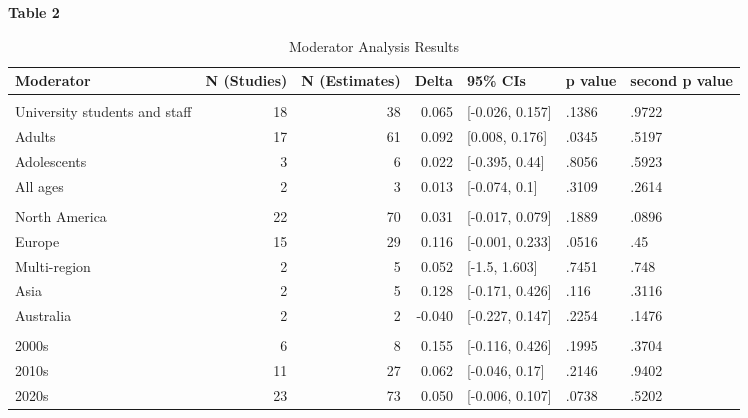 \documentclass[sn-nature,referee,pdflatex]{sn-jnl}
\begin{document}
\textbf{Table 2}

\begin{table}

\caption{\label{tab:table_two}Moderator Analysis Results}
\centering
\begin{tabular}[t]{lrrrlll}
\toprule
Moderator & N (Studies) & N (Estimates) & Delta & 95\% CIs & p value & second p value\\
\midrule
\addlinespace[0.5em]
\multicolumn{7}{l}{\textbf{Population}}\\
\hspace{1em}University students and staff & 18 & 38 & 0.065 & {}[-0.026, 0.157] & .1386 & .9722\\
\hspace{1em}Adults & 17 & 61 & 0.092 & {}[0.008, 0.176] & .0345 & .5197\\
\hspace{1em}Adolescents & 3 & 6 & 0.022 & {}[-0.395, 0.44] & .8056 & .5923\\
\hspace{1em}All ages & 2 & 3 & 0.013 & {}[-0.074, 0.1] & .3109 & .2614\\
\addlinespace[0.5em]
\multicolumn{7}{l}{\textbf{Region}}\\
\hspace{1em}North America & 22 & 70 & 0.031 & {}[-0.017, 0.079] & .1889 & .0896\\
\hspace{1em}Europe & 15 & 29 & 0.116 & {}[-0.001, 0.233] & .0516 & .45\\
\hspace{1em}Multi-region & 2 & 5 & 0.052 & {}[-1.5, 1.603] & .7451 & .748\\
\hspace{1em}Asia & 2 & 5 & 0.128 & {}[-0.171, 0.426] & .116 & .3116\\
\hspace{1em}Australia & 2 & 2 & -0.040 & {}[-0.227, 0.147] & .2254 & .1476\\
\addlinespace[0.5em]
\multicolumn{7}{l}{\textbf{Publication Decade}}\\
\hspace{1em}2000s & 6 & 8 & 0.155 & {}[-0.116, 0.426] & .1995 & .3704\\
\hspace{1em}2010s & 11 & 27 & 0.062 & {}[-0.046, 0.17] & .2146 & .9402\\
\hspace{1em}2020s & 23 & 73 & 0.050 & {}[-0.006, 0.107] & .0738 & .5202\\

\end{tabular}
\end{table}
\end{document}
